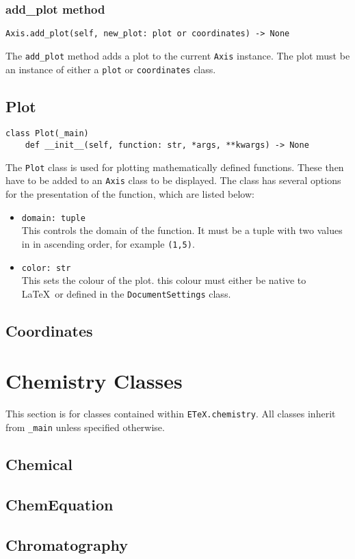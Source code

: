 \documentclass{article}
\begin{document}
\subsubsection{add\_plot method}\label{subsubsec:add_plot_method}
\begin{verbatim}
Axis.add_plot(self, new_plot: plot or coordinates) -> None
\end{verbatim}
The \verb|add_plot| method adds a plot to the current \verb|Axis| instance. The plot must be an instance of either a \verb|plot| or \verb|coordinates| class.
\subsection{Plot}\label{subsec:plot}
\begin{verbatim}
class Plot(_main)
	def __init__(self, function: str, *args, **kwargs) -> None
\end{verbatim}
The \verb|Plot| class is used for plotting mathematically defined functions. These then have to be added to an \verb|Axis| class to be displayed. The class has several options for the presentation of the function, which are listed below:\begin{itemize}
\item \verb|domain: tuple|\\This controls the domain of the function. It must be a tuple with two values in in ascending order, for example \verb|(1,5)|.
\item \verb|color: str|\\This sets the colour of the plot. this colour must either be native to \LaTeX\ or defined in the \verb|DocumentSettings| class.
\end{itemize}

\subsection{Coordinates}\label{subsec:coordinates}

\section{Chemistry Classes}\label{sec:chemistry_classes}
This section is for classes contained within \verb|ETeX.chemistry|. All classes inherit from \verb|_main| unless specified otherwise.
\subsection{Chemical}\label{subsec:chemical}

\subsection{ChemEquation}\label{subsec:chemequation}

\subsection{Chromatography}\label{subsec:chromatography}
\end{document}
